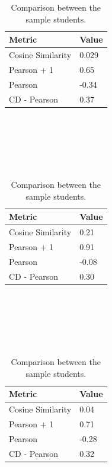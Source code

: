 \begin{table}[!htb]
\begin{subtable}{.5\linewidth}
    \end{subtable}
    \begin{subtable}{.5\linewidth}
      \centering
      
            \begin{tabular}{ll}
            \hline
            Metric            & Value  \\
            \hline
            Cosine Similarity &  0.029 \\
            Pearson + 1       &  0.65  \\
            Pearson           & -0.34  \\
            CD - Pearson      &  0.37  \\
            \hline
            \end{tabular}\\
            \\
            \caption{Comparison between $S_2$ and $S_3$.}\\
            \\
            
            \begin{tabular}{ll}
            \\
            \hline
            Metric            & Value  \\
            \hline
            Cosine Similarity &  0.21  \\
            Pearson + 1       &  0.91  \\
            Pearson           & -0.08  \\
            CD - Pearson      &  0.30  \\
            \hline
            \end{tabular}\\
            \\
            \caption{Comparison between $S_2$ and $S_4$.}\\
            \\
            
            \begin{tabular}{ll}
            \\
            \hline
            Metric            & Value  \\
            \hline
            Cosine Similarity &  0.04  \\
            Pearson + 1       &  0.71  \\
            Pearson           & -0.28  \\
            CD - Pearson      &  0.32  \\
            \hline
            \end{tabular}\\
            \\
            \caption{Comparison between $S_3$ and $S_4$.}\\
            \\
            
    \end{subtable} 
    \caption{Comparison between the sample students.}
    \label{table:results_interests_comp}
\end{table}


